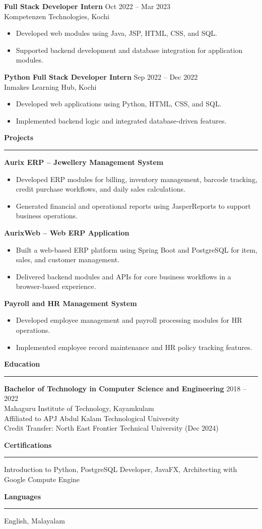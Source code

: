 \documentclass[a4paper,10pt]{article}
\newcommand{\resheading}[1]{\vspace{8pt}\textbf{\large #1}\par\hrule\vspace{4pt}}
\begin{document}
\textbf{Full Stack Developer Intern} \hfill Oct 2022 -- Mar 2023\\
Kompetenzen Technologies, Kochi
\begin{itemize}
\item Developed web modules using Java, JSP, HTML, CSS, and SQL.
\item Supported backend development and database integration for application modules.
\end{itemize}

\textbf{Python Full Stack Developer Intern} \hfill Sep 2022 -- Dec 2022\\
Inmakes Learning Hub, Kochi
\begin{itemize}
\item Developed web applications using Python, HTML, CSS, and SQL.
\item Implemented backend logic and integrated database-driven features.
\end{itemize}

\resheading{Projects}
\textbf{Aurix ERP -- Jewellery Management System}
\begin{itemize}
\item Developed ERP modules for billing, inventory management, barcode tracking, credit purchase workflows, and daily sales calculations.
\item Generated financial and operational reports using JasperReports to support business operations.
\end{itemize}

\textbf{AurixWeb -- Web ERP Application}
\begin{itemize}
\item Built a web-based ERP platform using Spring Boot and PostgreSQL for item, sales, and customer management.
\item Delivered backend modules and APIs for core business workflows in a browser-based experience.
\end{itemize}

\textbf{Payroll and HR Management System}
\begin{itemize}
\item Developed employee management and payroll processing modules for HR operations.
\item Implemented employee record maintenance and HR policy tracking features.
\end{itemize}

\resheading{Education}
\textbf{Bachelor of Technology in Computer Science and Engineering} \hfill 2018 -- 2022\\
Mahaguru Institute of Technology, Kayamkulam\\
Affiliated to APJ Abdul Kalam Technological University\\
Credit Transfer: North East Frontier Technical University (Dec 2024)

\resheading{Certifications}
Introduction to Python, PostgreSQL Developer, JavaFX, Architecting with Google Compute Engine

\resheading{Languages}
English, Malayalam
\end{document}
